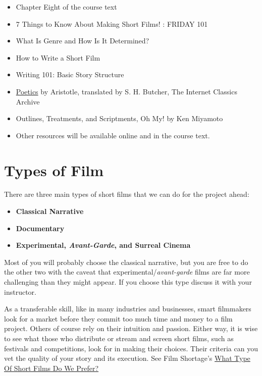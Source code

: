 \documentclass[
]{book}
\providecommand{\tightlist}{%
  \setlength{\itemsep}{0pt}\setlength{\parskip}{0pt}}
\begin{document}
\begin{itemize}
\tightlist
\item
  Chapter Eight of the course text\\
\item
  7 Things to Know About Making Short Films! : FRIDAY 101\\
\item
  What Is Genre and How Is It Determined? \\
\item
  How to Write a Short Film \\
\item
  Writing 101: Basic Story Structure \\
\item
  \ul{Poetics} by Aristotle, translated by S. H. Butcher, The Internet Classics Archive \\
\item
  Outlines, Treatments, and Scriptments, Oh My! by Ken Miyamoto \\
\item
  Other resources will be available online and in the course text.
\end{itemize}

\hypertarget{types-of-film}{%
\section{Types of Film}\label{types-of-film}}

There are three main types of short films that we can do for the project ahead:

\begin{itemize}
\item
  \textbf{Classical Narrative}
\item
  \textbf{Documentary}
\item
  \textbf{Experimental, \emph{Avant-Garde}, and Surreal Cinema}
\end{itemize}

Most of you will probably choose the classical narrative, but you are free to do the other two with the caveat that experimental/\emph{avant-garde} films are far more challenging than they might appear. If you choose this type discuss it with your instructor.

As a transferable skill, like in many industries and businesses, smart filmmakers look for a market before they commit too much time and money to a film project. Others of course rely on their intuition and passion. Either way, it is wise to see what those who distribute or stream and screen short films, such as festivals and competitions, look for in making their choices. Their criteria can you vet the quality of your story and its execution.
See Film Shortage's \href{https://filmshortage.com/what-we-like/}{What Type Of Short Films Do We Prefer?}
\end{document}
